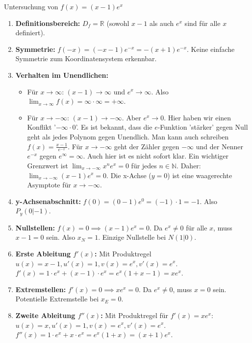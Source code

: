 \begin{beispielumgebung}{Untersuchung von $f(x) = (x-1)e^x$}
\begin{enumerate}
    \item \textbf{Definitionsbereich:} $D_f = \mathbb{R}$ (sowohl $x-1$ als auch $e^x$ sind für alle $x$ definiert).
    \item \textbf{Symmetrie:}
        $f(-x) = (-x-1)e^{-x} = -(x+1)e^{-x}$.
        Keine einfache Symmetrie zum Koordinatensystem erkennbar.
    \item \textbf{Verhalten im Unendlichen:}
        \begin{itemize}
            \item Für $x \to \infty$: $(x-1) \to \infty$ und $e^x \to \infty$. Also $\lim_{x \to \infty} f(x) = \infty \cdot \infty = +\infty$.
            \item Für $x \to -\infty$: $(x-1) \to -\infty$. Aber $e^x \to 0$. Hier haben wir einen Konflikt '$-\infty \cdot 0$'. Es ist bekannt, dass die $e$-Funktion 'stärker' gegen Null geht als jedes Polynom gegen Unendlich. Man kann auch schreiben $f(x) = \frac{x-1}{e^{-x}}$. Für $x \to -\infty$ geht der Zähler gegen $-\infty$ und der Nenner $e^{-x}$ gegen $e^{\infty} = \infty$. Auch hier ist es nicht sofort klar.
            Ein wichtiger Grenzwert ist $\lim_{x \to -\infty} x^n e^x = 0$ für jedes $n \in \mathbb{N}$.
            Daher: $\lim_{x \to -\infty} (x-1)e^x = 0$. Die x-Achse ($y=0$) ist eine waagerechte Asymptote für $x \to -\infty$.
        \end{itemize}
    \item \textbf{y-Achsenabschnitt:} $f(0) = (0-1)e^0 = (-1) \cdot 1 = -1$. Also $P_y(0|-1)$.
    \item \textbf{Nullstellen:} $f(x)=0 \implies (x-1)e^x = 0$.
        Da $e^x \neq 0$ für alle $x$, muss $x-1=0$ sein.
        Also $x_N = 1$. Einzige Nullstelle bei $N(1|0)$.
    \item \textbf{Erste Ableitung $f'(x)$:} Mit Produktregel $u(x)=x-1, u'(x)=1, v(x)=e^x, v'(x)=e^x$.
        $f'(x) = 1 \cdot e^x + (x-1) \cdot e^x = e^x (1 + x - 1) = xe^x$.
    \item \textbf{Extremstellen:} $f'(x)=0 \implies xe^x = 0$.
        Da $e^x \neq 0$, muss $x=0$ sein. Potentielle Extremstelle bei $x_E=0$.
    \item \textbf{Zweite Ableitung $f''(x)$:} Mit Produktregel für $f'(x)=xe^x$: $u(x)=x, u'(x)=1, v(x)=e^x, v'(x)=e^x$.
        $f''(x) = 1 \cdot e^x + x \cdot e^x = e^x(1+x) = (x+1)e^x$.

\end{enumerate}
\end{beispielumgebung}
